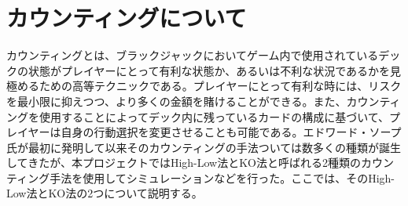 \section{カウンティングについて}
カウンティングとは、ブラックジャックにおいてゲーム内で使用されているデックの状態がプレイヤーにとって有利な状態か、あるいは不利な状況であるかを見極めるための高等テクニックである。プレイヤーにとって有利な時には、リスクを最小限に抑えつつ、より多くの金額を賭けることができる。また、カウンティングを使用することによってデック内に残っているカードの構成に基づいて、プレイヤーは自身の行動選択を変更させることも可能である。エドワード・ソープ氏が最初に発明して以来そのカウンティングの手法ついては数多くの種類が誕生してきたが、本プロジェクトではHigh-Low法とKO法と呼ばれる2種類のカウンティング手法を使用してシミュレーションなどを行った。ここでは、そのHigh-Low法とKO法の2つについて説明する。

